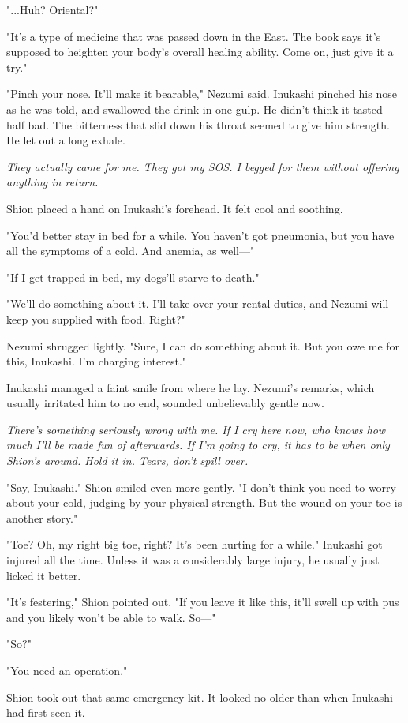 "...Huh? Oriental?"

"It's a type of medicine that was passed down in the East. The book says
it's supposed to heighten your body's overall healing ability. Come on,
just give it a try."

"Pinch your nose. It'll make it bearable," Nezumi said. Inukashi pinched
his nose as he was told, and swallowed the drink in one gulp. He didn't
think it tasted half bad. The bitterness that slid down his throat
seemed to give him strength. He let out a long exhale.

\emph{They actually came for me. They got my SOS. I begged for them without
offering anything in return.}

Shion placed a hand on Inukashi's forehead. It felt cool and soothing.

"You'd better stay in bed for a while. You haven't got pneumonia, but
you have all the symptoms of a cold. And anemia, as well---"

"If I get trapped in bed, my dogs'll starve to death."

"We'll do something about it. I'll take over your rental duties, and
Nezumi will keep you supplied with food. Right?"

Nezumi shrugged lightly. "Sure, I can do something about it. But you owe
me for this, Inukashi. I'm charging interest."

Inukashi managed a faint smile from where he lay. Nezumi's remarks,
which usually irritated him to no end, sounded unbelievably gentle now.

\emph{There's something seriously wrong with me. If I cry here now, who knows
how much I'll be made fun of afterwards. If I'm going to cry, it has to
be when only Shion's around. Hold it in. Tears, don't spill over.}

"Say, Inukashi." Shion smiled even more gently. "I don't think you need
to worry about your cold, judging by your physical strength. But the
wound on your toe is another story."

"Toe? Oh, my right big toe, right? It's been hurting for a while."
Inukashi got injured all the time. Unless it was a considerably large
injury, he usually just licked it better.

"It's festering," Shion pointed out. "If you leave it like this, it'll
swell up with pus and you likely won't be able to walk. So---"

"So?"

"You need an operation."

Shion took out that same emergency kit. It looked no older than when
Inukashi had first seen it.

